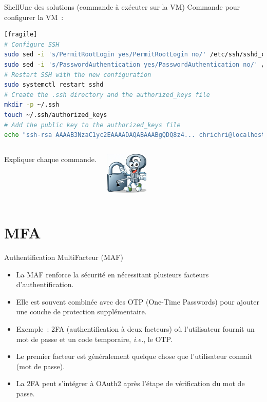 \documentclass{beamer}
\begin{document}
    \begin{frame}[fragile]{Shell}{Une des solutions (commande à exécuter sur la VM)}
        Commande pour configurer la VM~:
        \begin{lstlisting}[language=bash][fragile]
# Configure SSH
sudo sed -i 's/PermitRootLogin yes/PermitRootLogin no/' /etc/ssh/sshd_config
sudo sed -i 's/PasswordAuthentication yes/PasswordAuthentication no/' /etc/ssh/sshd_config
# Restart SSH with the new configuration
sudo systemctl restart sshd
# Create the .ssh directory and the authorized_keys file
mkdir -p ~/.ssh
touch ~/.ssh/authorized_keys
# Add the public key to the authorized_keys file
echo "ssh-rsa AAAAB3NzaC1yc2EAAAADAQABAAABgQDQ8z4... chrichri@localhost" >> ~/.ssh/authorized_keys
        \end{lstlisting}
        \begin{columns}
            Expliquer chaque commande.
            \begin{center}
                \includegraphics[width=2cm]{image/funny-key}
            \end{center}
        \end{columns}
    \end{frame}


    \section{MFA}\label{sec:mfa}

    \begin{frame}{Authentification MultiFacteur (MAF)}
        \begin{itemize}
            \item La MAF renforce la sécurité en nécessitant plusieurs facteurs d'authentification.
            \item Elle est souvent combinée avec des OTP (One-Time Passwords) pour ajouter une couche de protection supplémentaire.
            \item Exemple~: 2FA (authentification à deux facteurs) où l'utilisateur fournit un mot de passe et un code temporaire, \textit{i.e.}, le OTP.
            \item Le premier facteur est généralement quelque chose que l'utilisateur connait (mot de passe).
            \item La 2FA peut s'intégrer à OAuth2 après l'étape de vérification du mot de passe.
        \end{itemize}
    \end{frame}
\end{document}
